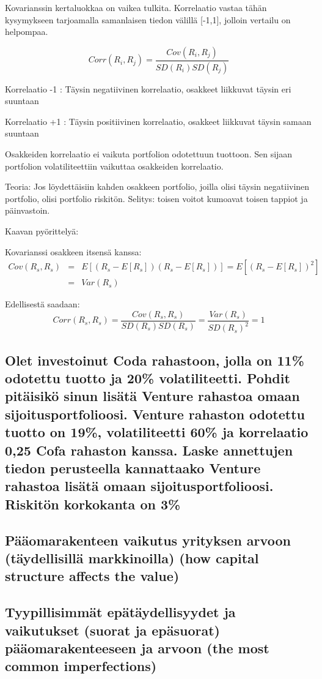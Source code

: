 \documentclass[a4paper]{article}
\begin{document}
Kovarianssin kertaluokkaa on vaikea tulkita. Korrelaatio vastaa tähän kysymykseen tarjoamalla samanlaisen tiedon välillä [-1,1], jolloin vertailu on helpompaa.

\[
    Corr(R_i, R_j) = \frac{Cov(R_i, R_j)}{SD(R_i) SD(R_j)}
\]

Korrelaatio -1 : Täysin negatiivinen korrelaatio, osakkeet liikkuvat täysin eri suuntaan

Korrelaatio +1 : Täysin positiivinen korrelaatio, osakkeet liikkuvat täysin samaan suuntaan

Osakkeiden korrelaatio ei vaikuta portfolion odotettuun tuottoon. Sen sijaan portfolion volatiliteettiin vaikuttaa osakkeiden korrelaatio.

Teoria: Jos löydettäisiin kahden osakkeen portfolio, joilla olisi täysin negatiivinen portfolio, olisi portfolio riskitön. Selitys: toisen voitot kumoavat toisen tappiot ja päinvastoin.

Kaavan pyörittelyä:

Kovarianssi osakkeen itsensä kanssa:
\[
\begin{array}{lcl}
Cov(R_s, R_s) & = & E[(R_s - E[R_s])(R_s - E[R_s])] = E[(R_s - E[R_s])^2] \\
 & = & Var(R_s)
\end{array}
\]

Edellisestä saadaan:
\[
Corr(R_s, R_s) = \frac{Cov(R_s, R_s)}{SD(R_s) SD(R_s)} = \frac{Var(R_s)}{SD(R_s)^2} = 1
\]

\subsection{Olet investoinut Coda rahastoon, jolla on 11\% odotettu tuotto ja 20\% volatiliteetti. Pohdit pitäisikö sinun lisätä Venture rahastoa omaan sijoitusportfolioosi. Venture rahaston odotettu tuotto on 19\%, volatiliteetti 60\% ja korrelaatio 0,25 Cofa rahaston kanssa. Laske annettujen tiedon perusteella kannattaako Venture rahastoa lisätä omaan sijoitusportfolioosi. Riskitön korkokanta on 3\%}

\subsection{Pääomarakenteen vaikutus yrityksen arvoon (täydellisillä markkinoilla) (how capital structure affects the value)}

\subsection{Tyypillisimmät epätäydellisyydet ja vaikutukset (suorat ja epäsuorat) pääomarakenteeseen ja arvoon
(the most common imperfections)}
\end{document}
